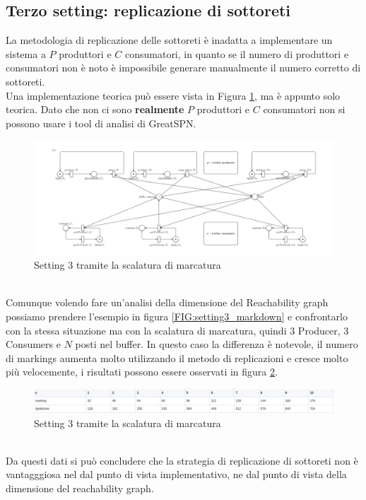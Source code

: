 \documentclass{article}
\newcommand{\greatspn}{GreatSPN}
\begin{document}
\newpage
\subsection{Terzo  setting: replicazione di sottoreti}\label{SEC:terzo-replica}
La metodologia di replicazione delle sottoreti è inadatta a implementare un sistema a $P$ produttori e $C$ consumatori, in quanto se il numero di produttori e consumatori non è noto è impossibile generare manualmente il numero corretto di sottoreti.\\
Una implementazione teorica può essere vista in Figura \ref{FIG:setting3_scale}, ma è appunto solo teorica.
Dato che non ci sono \textbf{realmente} $P$ produttori e $C$ consumatori non si possono usare i tool di analisi di \greatspn.
\begin{figure}[!ht]
\centering
\centerline{\includegraphics[scale=0.2]{./Esercizio2_img/setting3_scale.png}}
\caption{Setting 3 tramite la scalatura di marcatura} \label{FIG:setting3_scale}
\end{figure}\\
Comunque volendo fare un'analisi della dimensione del Reachability graph possiamo prendere l'esempio in figura \ref{FIG:setting3_markdown} e confrontarlo con la stessa situazione ma con la scalatura di marcatura, quindi 3 Producer, 3 Consumers e $N$ posti nel buffer.
In questo caso la differenza è notevole, il numero di markings aumenta molto utilizzando il metodo di replicazioni e cresce molto più velocemente, i risultati possono essere osservati in figura \ref{FIG:confronto}.\\
\begin{figure}[!ht]
\centering
\centerline{\includegraphics[scale=0.5]{./Esercizio2_img/confronto.png}}
\caption{Setting 3 tramite la scalatura di marcatura} \label{FIG:confronto}
\end{figure}\\Da questi dati si può concludere che la strategia di replicazione di sottoreti non è vantagggiosa nel dal punto di vista implementativo, ne dal punto di vista della dimensione del reachability graph.
\end{document}
